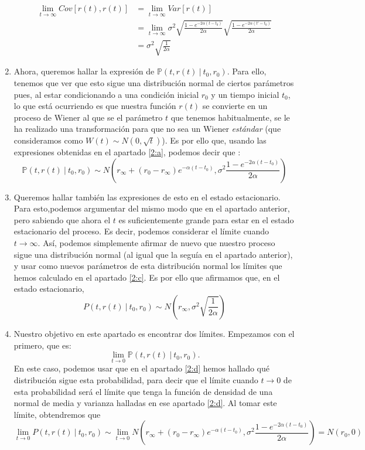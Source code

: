 \documentclass[a4paper]{article}
\begin{document}
\begin{enumerate}[label=(\alph*)]
        \begin{align*}
          \lim_{t\to \infty} Cov[r(t), r(t)] & = \lim_{t \to \infty} Var[r(t)] \\
         & = \lim_{t \to \infty} \sigma^{2}\sqrt{\frac{1- e^{-2\alpha (t-t_{0})}}{2\alpha}}\sqrt{\frac{1- e^{-2\alpha (t'-t_{0})}}{2\alpha}}\\
          & =  \sigma^{2} \sqrt{ \frac{1}{2\alpha} }
        \end{align*}

  \item \label{2:d} Ahora, queremos hallar la expresión de $ \mathbb P(t,r(t) \ | \ t_{0},r_{0})$. Para ello, tenemos que ver que esto sigue una distribución normal de ciertos parámetros pues, al estar condicionando a una condición inicial $r_{0}$ y un tiempo inicial $t_{0}$, lo que está ocurriendo es que nuestra función $r(t)$ se convierte en un proceso de Wiener al que se el parámetro $t$ que tenemos habitualmente, se le ha realizado una transformación para que no sea un Wiener \emph{estándar} (que consideramos como $W(t) \sim N(0,\sqrt{t})$). Es por ello que, usando las expresiones obtenidas en el apartado \ref{2:a}, podemos decir que :
        \[
        \mathbb P(t,r(t) \ | \ t_{0}, r_{0}) \sim N\left(r_{\infty} + (r_{0} - r_{\infty})e^{-\alpha(t-t_{0})}, \sigma^{2} \frac{1 - e^{-2\alpha (t-t_{0})}}{2\alpha}\right)
        \]

  \item \label{2:e} Queremos hallar también las expresiones de esto en el estado estacionario. Para esto,podemos argumentar del mismo modo que en el apartado anterior, pero sabiendo que ahora el $t$ es suficientemente grande para estar en el estado estacionario del proceso. Es decir, podemos considerar el límite cuando $t \to \infty$. Así, podemos simplemente afirmar de nuevo que nuestro proceso sigue una distribución normal (al igual que la seguía en el apartado anterior), y usar como nuevos parámetros de esta distribución normal los límites que hemos calculado en el apartado \ref{2:c}. Es por ello que afirmamos que, en el estado estacionario,
        \[
        P(t,r(t)\ | \ t_{0}, r_{0}) \sim N\left(r_{\infty}, \sigma^{2}\sqrt{\frac{1}{2\alpha}}\right)
        \]

  \item Nuestro objetivo en este apartado es encontrar dos límites. Empezamos con el primero, que es:
        \[
        \lim_{t \to 0} \mathbb P(t,r(t) \ | \ t_{0}, r_{0}).
        \]
        En este caso, podemos usar que en el apartado \ref{2:d} hemos hallado qué distribución sigue esta probabilidad, para decir que el límite cuando $t \to 0$ de esta probabilidad será el límite que tenga la función de densidad de una normal de media y varianza halladas en ese apartado \ref{2:d}. Al tomar este límite, obtendremos que
        \[
        \lim_{t\to 0} P(t,r(t) \ | \ t_{0}, r_{0}) \sim \lim_{t \to 0}  N\left(r_{\infty} + (r_{0} - r_{\infty})e^{-\alpha(t-t_{0})}, \sigma^{2} \frac{1 - e^{-2\alpha (t-t_{0})}}{2\alpha}\right) = N\left(r_{0}, 0\right)
        \]


\end{enumerate}
\end{document}
